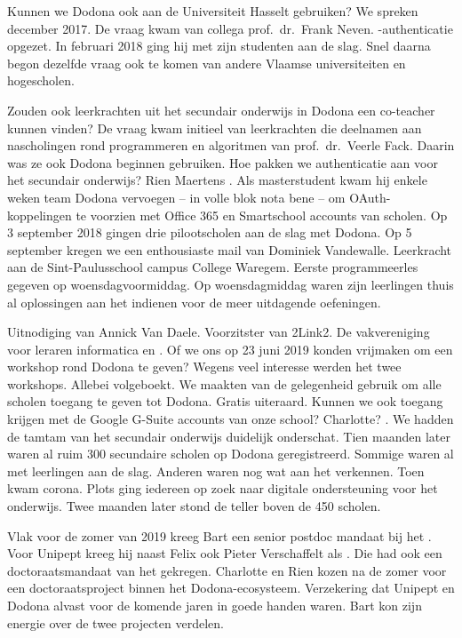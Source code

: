 Kunnen we Dodona ook aan de Universiteit Hasselt gebruiken?
We spreken december 2017.
De vraag kwam van collega prof.\ dr.\ Frank Neven.
-authenticatie opgezet.
In februari 2018 ging hij met zijn studenten aan de slag.
Snel daarna begon dezelfde vraag ook te komen van andere Vlaamse universiteiten en hogescholen.

Zouden ook leerkrachten uit het secundair onderwijs in Dodona een co-teacher kunnen vinden?
De vraag kwam initieel van leerkrachten die deelnamen aan nascholingen rond programmeren en algoritmen van prof.\ dr.\ Veerle Fack.
Daarin was ze ook Dodona beginnen gebruiken.
Hoe pakken we authenticatie aan voor het secundair onderwijs?
Rien Maertens .
Als masterstudent kwam hij enkele weken team Dodona vervoegen -- in volle blok nota bene -- om OAuth-koppelingen te voorzien met Office 365 en Smartschool accounts van scholen.
Op 3 september 2018 gingen drie pilootscholen aan de slag met Dodona.
Op 5 september kregen we een enthousiaste mail van Dominiek Vandewalle.
Leerkracht  aan de Sint-Paulusschool campus College Waregem.
Eerste programmeerles gegeven op woensdagvoormiddag.
Op woensdagmiddag waren zijn leerlingen thuis al oplossingen aan het indienen voor de meer uitdagende oefeningen.

Uitnodiging van Annick Van Daele.
Voorzitster van 2Link2.
De vakvereniging voor leraren informatica en .
Of we ons op 23 juni 2019 konden vrijmaken om een workshop rond Dodona te geven?
Wegens veel interesse werden het twee workshops.
Allebei volgeboekt.
We maakten van de gelegenheid gebruik om alle scholen toegang te geven tot Dodona.
Gratis uiteraard.
Kunnen we ook toegang krijgen met de Google G-Suite accounts van onze school?
Charlotte?
.
We hadden de tamtam van het secundair onderwijs duidelijk onderschat.
Tien maanden later waren al ruim 300 secundaire scholen op Dodona geregistreerd.
Sommige waren al met leerlingen aan de slag.
Anderen waren nog wat aan het verkennen.
Toen kwam corona.
Plots ging iedereen op zoek naar digitale ondersteuning voor het onderwijs.
Twee maanden later stond de teller boven de 450 scholen.

Vlak voor de zomer van 2019 kreeg Bart een senior postdoc mandaat bij het \@.
Voor Unipept kreeg hij naast Felix ook Pieter Verschaffelt als .
Die had ook een doctoraatsmandaat van het  gekregen.
Charlotte en Rien kozen na de zomer voor een doctoraatsproject binnen het Dodona-ecosysteem.
Verzekering dat Unipept en Dodona alvast voor de komende jaren in goede handen waren.
Bart kon zijn energie over de twee projecten verdelen.

